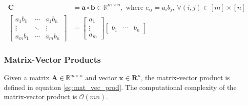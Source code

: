         \begin{align} \label{eq:vec_outer_prod}
            \mathbf{C} & = \mathbf{a} \circ \mathbf{b} \in \mathbb{R}^{m \times n}, \text{ where } c_{ij} = a_i b_j \text{, }\forall(i,j) \in [m] \times [n] \\
            \left[
                \begin{array}{ccc}
                    a_1b_1 & \cdots & a_1b_n \\
                    \vdots & \ddots & \vdots \\
                    a_mb_1 & \cdots & a_mb_n
                \end{array}
            \right]
            & =
            \left[
                \begin{array}{c}
                    a_1 \\
                    \vdots \\
                    a_m
                \end{array}
            \right]
            \left[
                \begin{array}{ccc}
                    b_1 & \cdots & b_n
                \end{array}
            \right] \nonumber
        \end{align}


    \subsubsection{Matrix-Vector Products} \label{sec:Matrix-Vector Products}
        Given a matrix $\mathbf{A}\in \mathbb{R}^{m\times n}$ and vector
        $\mathbf{x}\in \mathbf{R}^n$, the matrix-vector product is defined in
        equation \ref{eq:mat_vec_prod}. The computational complexity of the
        matrix-vector product is $\mathcal{O}(mn)$.

